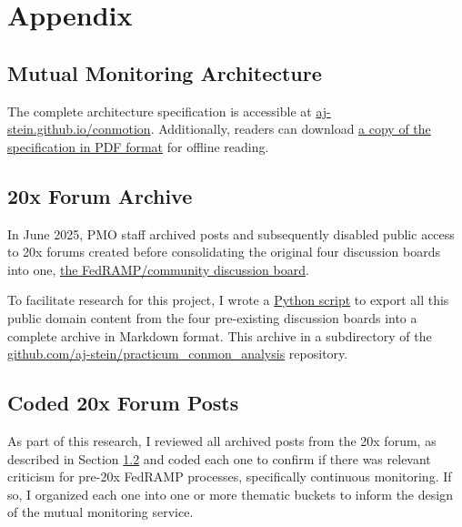 \documentclass{jdf}
\begin{document}



\section{Appendix}

\subsection{Mutual Monitoring Architecture} \label{architecture}

The complete architecture specification is accessible at \href{https://aj-stein.github.io/conmotion/architecture.html}{aj-stein.github.io/conmotion}. Additionally, readers can download \href{https://aj-stein.github.io/conmotion/architecture.pdf}{a copy of the specification in PDF format} for offline reading.

\subsection{20x Forum Archive} \label{20x_archive}

In June 2025, PMO staff archived posts and subsequently disabled public access to 20x forums created before consolidating the original four discussion boards into one, \href{https://github.com/FedRAMP/community/discussions}{the FedRAMP/community discussion board}.

To facilitate research for this project, I wrote a \href{https://github.com/aj-stein/practicum_conmon_analysis/blob/e0baba42dda242b137fa7ab583a3ceaecaf1e94f/src/download_discussions.py}{Python script} to export all this public domain content from the four pre-existing discussion boards into a complete archive in Markdown format. This archive in a subdirectory of the \href{https://github.com/aj-stein/practicum\_conmon\_analysis/tree/e0baba42dda242b137fa7ab583a3ceaecaf1e94f/data/fedramp}{github.com/aj-stein/practicum\_conmon\_analysis} repository.

\subsection{Coded 20x Forum Posts} \label{20x_archive_coded}

As part of this research, I reviewed all archived posts from the 20x forum, as described in Section \ref{20x_archive} and coded each one to confirm if there was relevant criticism for pre-20x FedRAMP processes, specifically continuous monitoring. If so, I organized each one into one or more thematic buckets to inform the design of the mutual monitoring service.
\end{document}
